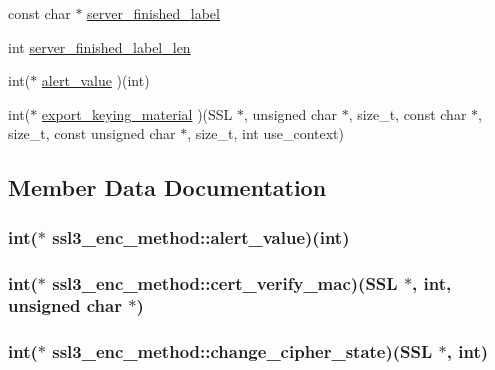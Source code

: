 \begin{DoxyCompactItemize}
const char $\ast$ \hyperlink{structssl3__enc__method_a395147aef41fded62c7690876b1c016a}{server\-\_\-finished\-\_\-label}
\item 
int \hyperlink{structssl3__enc__method_a09dad445d45b7e4ead7dba8eff209f5d}{server\-\_\-finished\-\_\-label\-\_\-len}
\item 
int($\ast$ \hyperlink{structssl3__enc__method_aad11cf6fc0fe09469b05f387f7a11a80}{alert\-\_\-value} )(int)
\item 
int($\ast$ \hyperlink{structssl3__enc__method_a9b209b57ac54b2cb1eaddae25df08889}{export\-\_\-keying\-\_\-material} )(S\-S\-L $\ast$, unsigned char $\ast$, size\-\_\-t, const char $\ast$, size\-\_\-t, const unsigned char $\ast$, size\-\_\-t, int use\-\_\-context)
\end{DoxyCompactItemize}


\subsection{Member Data Documentation}
\hypertarget{structssl3__enc__method_aad11cf6fc0fe09469b05f387f7a11a80}{
\subsubsection[{alert\-\_\-value}]{\setlength{\rightskip}{0pt plus 5cm}int($\ast$ ssl3\-\_\-enc\-\_\-method\-::alert\-\_\-value)(int)}}\label{structssl3__enc__method_aad11cf6fc0fe09469b05f387f7a11a80}
\hypertarget{structssl3__enc__method_a2a6053ae07f8281fb69133e2cefcdfee}{
\subsubsection[{cert\-\_\-verify\-\_\-mac}]{\setlength{\rightskip}{0pt plus 5cm}int($\ast$ ssl3\-\_\-enc\-\_\-method\-::cert\-\_\-verify\-\_\-mac)(S\-S\-L $\ast$, int, unsigned char $\ast$)}}\label{structssl3__enc__method_a2a6053ae07f8281fb69133e2cefcdfee}
\hypertarget{structssl3__enc__method_a29246e7e0dc5501e0f2aab7a2dac2b1a}{
\subsubsection[{change\-\_\-cipher\-\_\-state}]{\setlength{\rightskip}{0pt plus 5cm}int($\ast$ ssl3\-\_\-enc\-\_\-method\-::change\-\_\-cipher\-\_\-state)(S\-S\-L $\ast$, int)}}\label{structssl3__enc__method_a29246e7e0dc5501e0f2aab7a2dac2b1a}
